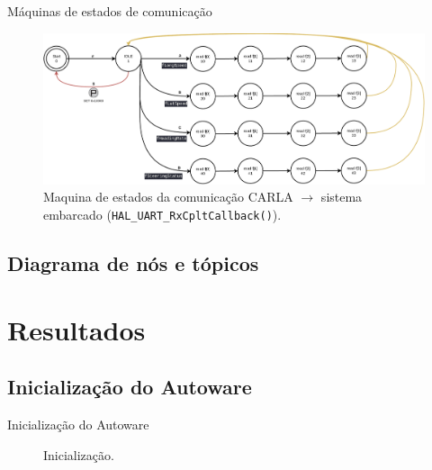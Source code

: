 \documentclass{if-beamer}
\begin{document}
\begin{frame}{Máquinas de estados de comunicação}
	
	\begin{figure}[H]
		\centering
		\includegraphics[width=\linewidth]{sm_carla_2_uc}
		\caption{Maquina de estados da comunicação CARLA $\longrightarrow$ sistema embarcado (\texttt{HAL\_UART\_RxCpltCallback()}).}
		\label{fig:sm_carla_2_uc}
	\end{figure}
	
\end{frame}


\subsection*{Diagrama de nós e tópicos}




\section{Resultados}

\subsection*{Inicialização do Autoware}

\begin{frame}{Inicialização do Autoware}
	
	\begin{figure}[H]
		\centering
		\caption{Inicialização.}
		\label{fig:microautoware_testing_initialization}
	\end{figure}
	
\end{frame}
\end{document}
